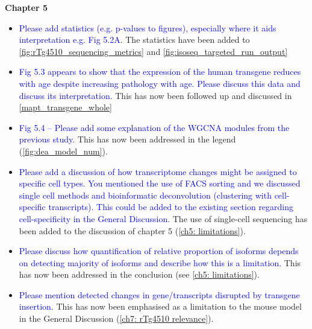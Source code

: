 \documentclass[a4paper,12pt,oneside]{report}
\begin{document}
\vspace{1cm}
\textbf{Chapter 5}
\begin{itemize}
	\item \textcolor{blue}{Please add statistics (e.g. p-values to figures), especially where it aids interpretation e.g. Fig 5.2A.}
	\newline The statistics have been added to \cref{fig:rTg4510_sequencing_metrics} and \cref{fig:isoseq_targeted_run_output}
	\item \textcolor{blue}{Fig 5.3 appears to show that the expression of the human transgene reduces with age despite increasing pathology with age. Please discuss this data and discuss its interpretation.}
	\newline This has now been followed up and discussed in \cref{mapt_transgene_whole}
	\item \textcolor{blue}{Fig 5.4 – Please add some explanation of the WGCNA modules from the previous study.}
	\newline This has now been addressed in the legend (\cref{fig:dea_model_num}).
	\item \textcolor{blue}{Please add a discussion of how transcriptome changes might be assigned to specific cell types. You mentioned the use of FACS sorting and we discussed single cell methods and bioinformatic deconvolution (clustering with cell-specific transcripts). This could be added to the existing section regarding cell-specificity in the General Discussion.}
	\newline The use of single-cell sequencing has been added to the discussion of chapter 5 (\cref{ch5: limitations}). 
	\item \textcolor{blue}{Please discuss how quantification of relative proportion of isoforms depends on detecting majority of isoforms and describe how this is a limitation.}
	\newline This has now been addressed in the conclusion (see \cref{ch5: limitations}). 
	\item \textcolor{blue}{Please mention detected changes in gene/transcripts disrupted by transgene insertion.}
	\newline This has now been emphasised as a limitation to the mouse model in the General Discussion (\cref{ch7: rTg4510 relevance}). 
\end{itemize}
 
\end{document}
